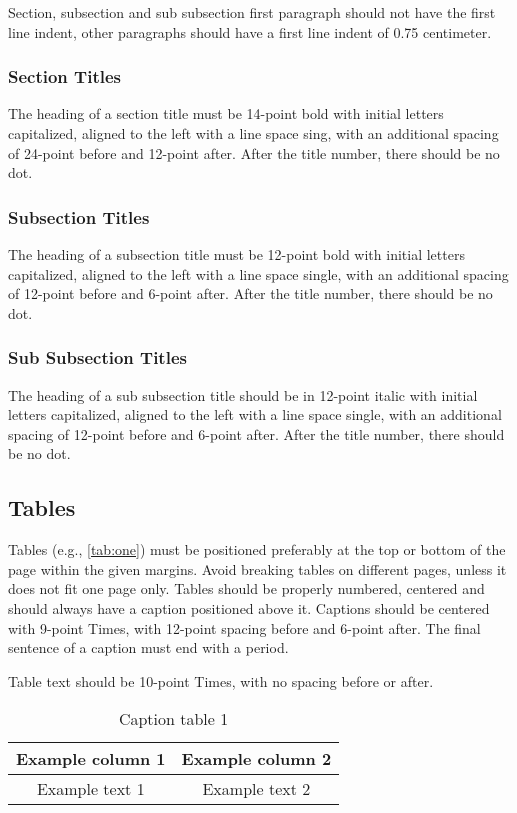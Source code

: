 \documentclass[english, spanish, brazilian]{RBIEarticle} %
\begin{document}
Section, subsection and sub subsection first paragraph should not have the first line indent, other paragraphs should have a first line indent of 0.75 centimeter.


\subsubsection{Section Titles}
The heading of a section title must be 14-point bold with initial letters capitalized, aligned to the left with a line space sing, with an additional spacing of 24-point before and 12-point after. After the title number, there should be no dot.


\subsubsection{Subsection Titles}
The heading of a subsection title must be 12-point bold with initial letters capitalized, aligned to the left with a line space single, with an additional spacing of 12-point before and 6-point after. After the title number, there should be no dot.


\subsubsection{Sub Subsection Titles}
The heading of a sub subsection title should be in 12-point italic with initial letters capitalized, aligned to the left with a line space single, with an additional spacing of 12-point before and 6-point after. After the title number, there should be no dot.


\subsection{Tables}
Tables (e.g., \autoref{tab:one}) must be positioned preferably at the top or bottom of the page within the given margins. Avoid breaking tables on different pages, unless it does not fit one page only. Tables should be properly numbered, centered and should always have a caption positioned above it. Captions should be centered with 9-point Times, with 12-point spacing before and 6-point after. The final sentence of a caption must end with a period.

Table text should be 10-point Times, with no spacing before or after.

\begin{table}[h]
	\caption{Caption table 1}
	\label{tab:one}
	\centering\footnotesize%
	\begin{tabular}{|c|c|}
		\hline
		\rowcolor{gray} \textbf{Example column 1} & \textbf{Example column 2}\\
		\hline
		Example text 1 & Example text 2\\
		\hline
	\end{tabular}
\end{table}
\end{document}
